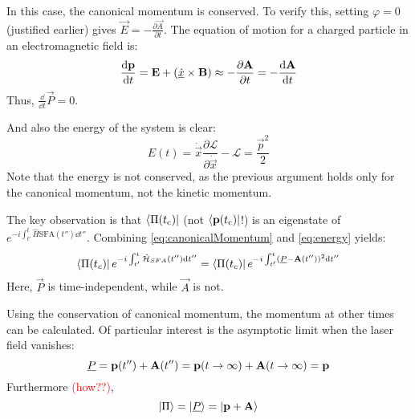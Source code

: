 In this case, the canonical momentum is conserved. 
To verify this, setting $\varphi=0$ (justified earlier) gives $\vec{E} = -\frac{\partial \vec{A}}{\partial t}$. 
The equation of motion for a charged particle in an electromagnetic field \cite{LandauLifschitzBand2} is:
\begin{equation*}
    \frac{\dd\vec{p}}{\dd t} = \vec{E} + \left(\uvec{\dot{x}}\times\vec{B}\right) \approx -\frac{\partial \vec{A}}{\partial t} = -\frac{\dd \vec{A}}{\dd t}   %
\end{equation*}
Thus, $\frac{\dd}{\dd t}\vec{P}=0$.

And also the energy of the system is clear:
\begin{equation}
    E(t) = \dot{\vec{x}}\frac{\partial \mathcal{L}}{\partial \dot{\vec{x}}}-\mathcal{L} = \frac{\vec{p}^2}{2} \label{eq:energy}
\end{equation}
Note that the energy is not conserved, as the previous argument holds only for the canonical momentum, not the kinetic momentum.

The key observation is that $\bra{\Pi(t_{\mathrm{c}})}$ (not $\bra{\mathbf{p}(t_{\mathrm{c}})}$!) is an eigenstate of $e^{-i \int_{t'}^{t} \hat{H}{\mathrm{SFA}}(t'') \dd t''}$. 
Combining \eqref{eq:canonicalMomentum} and \eqref{eq:energy} yields:
\begin{equation*}
    \bra{\Pi(t_c)}e^{-i \int_{t'}^{t} \hat{\mathcal{H}}_{SFA}(t'') \mathrm{d} t''} = \bra{\Pi(t_c)}e^{-i \int_{t'}^{t} (\underline{P} - \mathbf{A}(t''))^2 \mathrm{d} t''}
\end{equation*}
Here, $\vec{P}$ is time-independent, while $\vec{A}$ is not.

Using the conservation of canonical momentum, the momentum at other times can be calculated. 
Of particular interest is the asymptotic limit when the laser field vanishes:
\begin{equation*}
    \underline{P} = \mathbf{p}(t'') + \mathbf{A}(t'') = \mathbf{p}(t\rightarrow \infty) + \mathbf{A}(t\rightarrow \infty) = \mathbf{p}
\end{equation*}
Furthermore \textcolor{red}{(how??)},
\begin{equation*}
    \ket{\Pi} = \ket{\underline{P}} = \ket{\mathbf{p}+\mathbf{A}}
\end{equation*}

